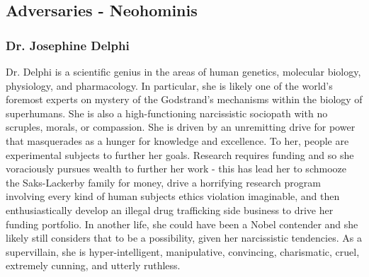 \documentclass[letterpaper,serif]{rpg-module}
\begin{document}
\subsection{Adversaries - Neohominis}

\subsubsection{Dr. Josephine  Delphi}

Dr. Delphi is a scientific genius in the areas of human genetics, molecular biology, physiology, and pharmacology. In particular, she is likely one of the world's foremost experts on mystery of the Godstrand's mechanisms within the biology of superhumans. She is also a high-functioning narcissistic sociopath with no scruples, morals, or compassion. She is driven by an unremitting drive for power that masquerades as a hunger for knowledge and excellence. To her, people are experimental subjects to further her goals. Research requires funding and so she voraciously pursues wealth to further her work - this has lead her to schmooze the Saks-Lackerby family for money, drive a horrifying research program involving every kind of human subjects ethics violation imaginable, and then enthusiastically develop an illegal drug trafficking side business to drive her funding portfolio. In another life, she could have been a Nobel contender and she likely still considers that to be a possibility, given her narcissistic tendencies. As a supervillain, she is hyper-intelligent, manipulative, convincing, charismatic, cruel, extremely cunning, and utterly ruthless. 

\vspace{12pt}
\end{document}
